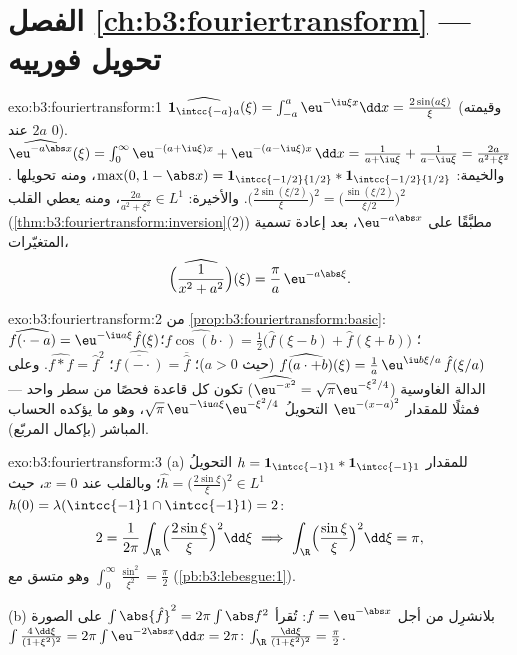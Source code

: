 \section*{الفصل \ref{ch:b3:fouriertransform} --- تحويل
فورييه}

\begin{solution}{exo:b3:fouriertransform:1}
$\widehat{\mathbf 1_{\intcc{-a}a}}(\xi) =
\int_{-a}^a\eu^{-\iu\xi x}\dd x = \frac{2\sin(a\xi)}{\xi}$
(وقيمته $2a$ عند $0$).
$\widehat{\eu^{-a\abs x}}(\xi) = \int_0^\infty\eu^{-(a +
\iu\xi)x} + \eu^{-(a - \iu\xi)x}\,\dd x = \frac1{a + \iu\xi} +
\frac1{a - \iu\xi} = \frac{2a}{a^2 + \xi^2}$.
والخيمة: $\max(0, 1 - \abs x) = \mathbf 1_{\intcc{-1/2}{1/2}} *
\mathbf 1_{\intcc{-1/2}{1/2}}$، ومنه تحويلها $\bigl(\frac{2\sin(\xi/2)}\xi\bigr)^2 =
\bigl(\frac{\sin(\xi/2)}{\xi/2}\bigr)^2$.
والأخيرة: $\frac{2a}{a^2+\xi^2} \in L^1$، ومنه يعطي القلب (\cref{thm:b3:fouriertransform:inversion}(2)) مطبَّقًا على
$\eu^{-a\abs x}$، بعد إعادة تسمية المتغيّرات،
\[
\widehat{\Bigl(\frac1{x^2 + a^2}\Bigr)}(\xi) =
\frac{\pi}{a}\,\eu^{-a\abs\xi} .
\]
\end{solution}

\begin{solution}{exo:b3:fouriertransform:2}
من \cref{prop:b3:fouriertransform:basic}:
$\widehat{f(\cdot - a)} = \eu^{-\iu a\xi}\hat f(\xi)$؛
$\widehat{f\cos(b\cdot)} = \frac12\bigl(\hat f(\xi - b) + \hat
f(\xi + b)\bigr)$؛
$\widehat{f(a\cdot + b)}(\xi) = \frac1a\,\eu^{\iu
b\xi/a}\,\hat f(\xi/a)$ (حيث $a > 0$)؛
$\widehat{\overline{f(-\cdot)}} = \overline{\hat f}$؛
$\widehat{f * f} = \hat f^2$. وعلى الدالة الغاوسية ($\widehat{\eu^{-x^2}} = \sqrt\pi\eu^{-\xi^2/4}$) تكون كل قاعدة فحصًا من
سطر واحد --- فمثلًا للمقدار $\eu^{-(x-a)^2}$ التحويلُ $\sqrt\pi\,\eu^{-\iu a\xi}\eu^{-\xi^2/4}$،
وهو ما يؤكده الحساب المباشر (بإكمال المربّع).
\end{solution}

\begin{solution}{exo:b3:fouriertransform:3}
(a) للمقدار $h = \mathbf 1_{\intcc{-1}1}*\mathbf 1_{\intcc{-1}1}$ التحويلُ $\hat h = \bigl(\frac{2\sin\xi}\xi\bigr)^2 \in L^1$؛ وبالقلب عند $x = 0$، حيث
$h(0) = \lambda(\intcc{-1}1\cap\intcc{-1}1)
= 2$:
\[
2 = \frac1{2\pi}\int_\R\Bigl(\frac{2\sin\xi}\xi\Bigr)^2
\dd\xi
\ \Longrightarrow\
\int_\R\Bigl(\frac{\sin\xi}\xi\Bigr)^2\dd\xi = \pi ,
\]
وهو متسق مع $\int_0^\infty\frac{\sin^2}{\xi^2} =
\frac\pi2$ (\cref{pb:b3:lebesgue:1}).

(b) بلانشرِل من أجل $f = \eu^{-\abs x}$: تُقرأ $\int\abs{\hat f}^2 =
2\pi\int\abs f^2$ على الصورة $\int\frac{4\,\dd\xi}{(1 + \xi^2)^2} =
2\pi\int\eu^{-2\abs x}\dd x = 2\pi$:
$\int_\R\frac{\dd\xi}{(1+\xi^2)^2} = \frac\pi2$.
\end{solution}

